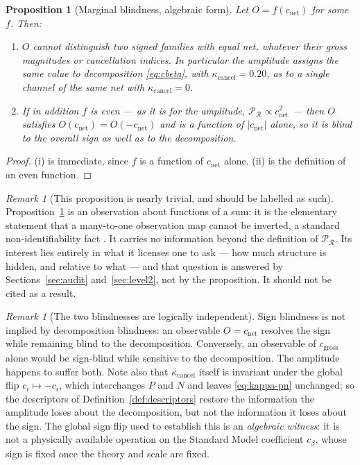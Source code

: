 \documentclass[11pt]{article}
\newtheorem{proposition}[theorem]{Proposition}
\theoremstyle{definition}
\theoremstyle{remark}
\newtheorem{remark}[theorem]{Remark}
\newcommand{\net}{c_{\mathrm{net}}}
\newcommand{\gross}{c_{\mathrm{gross}}}
\newcommand{\kcancel}{\kappa_{\mathrm{cancel}}}
\begin{document}
\begin{proposition}[Marginal blindness, algebraic form]
\label{prop:marginal-blindness}
Let $O = f(\net)$ for some $f$. Then:
\begin{enumerate}
\item[(i)] $O$ cannot distinguish two signed families with equal net, whatever their gross
magnitudes or cancellation indices. In particular the amplitude assigns the same value to
decomposition \eqref{eq:cbeta}, with $\kcancel = 0.20$, as to a single channel of the same net with
$\kcancel = 0$.
\item[(ii)] If in addition $f$ is even --- as it is for the amplitude, $\mathcal{P}_\mathcal{R}
\propto c_{\mathrm{net}}^2$ --- then $O$ satisfies $O(\net) = O(-\net)$ and is a function of
$|\net|$ alone, so it is blind to the overall sign as well as to the decomposition.
\end{enumerate}
\end{proposition}

\begin{proof}
(i) is immediate, since $f$ is a function of $\net$ alone. (ii) is the definition of an even
function.
\end{proof}

\begin{remark}[This proposition is nearly trivial, and should be labelled as such]
\label{rem:trivial}
Proposition~\ref{prop:marginal-blindness} is an observation about functions of a sum: it is the
elementary statement that a many-to-one observation map cannot be inverted, a standard
non-identifiability fact \citep{Rothenberg1971}. It carries no information beyond the definition of
$\mathcal{P}_\mathcal{R}$. Its interest lies entirely in what it licenses one to ask --- how much
structure is hidden, and relative to what --- and that question is answered by
Sections~\ref{sec:audit} and~\ref{sec:level2}, not by the proposition. It should not be cited as a
result.
\end{remark}

\begin{remark}[The two blindnesses are logically independent]
\label{rem:logical-independence}
Sign blindness is not implied by decomposition blindness: an observable $O = \net$ resolves the
sign while remaining blind to the decomposition. Conversely, an observable of $\gross$ alone would
be sign-blind while sensitive to the decomposition. The amplitude happens to suffer both. Note also
that $\kcancel$ itself is invariant under the global flip $c_i \mapsto -c_i$, which interchanges $P$
and $N$ and leaves \eqref{eq:kappa-pn} unchanged; so the descriptors of Definition~\ref{def:descriptors}
restore the information the amplitude loses about the decomposition, but not the information it
loses about the sign. The global sign flip used to establish this is an \emph{algebraic witness}: it
is not a physically available operation on the Standard Model coefficient $c_\beta$, whose sign is
fixed once the theory and scale are fixed.
\end{remark}
\end{document}
